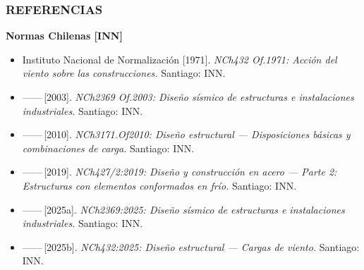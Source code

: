 ﻿\documentclass[11.5pt,aspectratio=169,handout]{beamer}
\newcommand{\ctitle}[1]{\frametitle{#1}}
\begin{document}
\begin{frame}
\ctitle{REFERENCIAS}
\vspace{-1mm}
\scriptsize\textbf{Normas Chilenas [INN]}\\[1mm]
\begin{itemize}\scriptsize\setlength{\itemsep}{0.5mm}
  \item Instituto Nacional de Normalización [1971]. \textit{NCh432 Of.1971:
        Acción del viento sobre las construcciones.} Santiago: INN.
  \item ——\,[2003]. \textit{NCh2369 Of.2003: Diseño sísmico de estructuras
        e instalaciones industriales.} Santiago: INN.
  \item ——\,[2010]. \textit{NCh3171.Of2010: Diseño estructural —
        Disposiciones básicas y combinaciones de carga.} Santiago: INN.
  \item ——\,[2019]. \textit{NCh427/2:2019: Diseño y construcción en acero
        — Parte 2: Estructuras con elementos conformados en frío.}
        Santiago: INN.
  \item ——\,[2025a]. \textit{NCh2369:2025: Diseño sísmico de estructuras
        e instalaciones industriales.} Santiago: INN.
  \item ——\,[2025b]. \textit{NCh432:2025: Diseño estructural — Cargas de
        viento.} Santiago: INN.
\end{itemize}
\end{frame}
\end{document}
